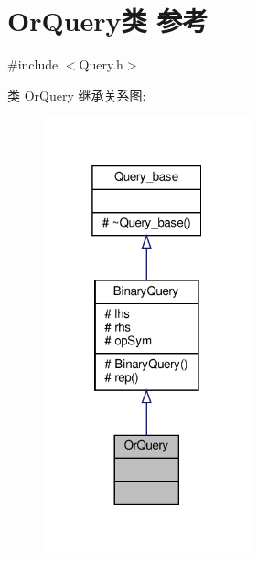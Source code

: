 \hypertarget{classOrQuery}{}\section{Or\+Query类 参考}
\label{classOrQuery}


{\ttfamily \#include $<$Query.\+h$>$}



类 Or\+Query 继承关系图\+:\nopagebreak
\begin{figure}[H]
\begin{center}
\leavevmode
\includegraphics[width=169pt]{classOrQuery__inherit__graph}
\end{center}
\end{figure}


